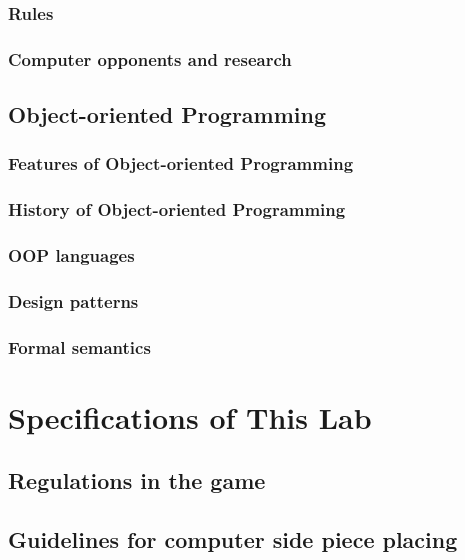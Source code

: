 \documentclass[a4paper]{report}
\begin{document}
\subsection{Rules}

\subsection{Computer opponents and research}




\section{Object-oriented Programming}
\subsection{Features of Object-oriented Programming}



\subsection{History of Object-oriented Programming}


\subsection{OOP languages}


\subsection{Design patterns}

\subsection{Formal semantics}




\chapter{Specifications of This Lab}
\section{Regulations in the game}



\section{Guidelines for computer side piece placing}
\end{document}
